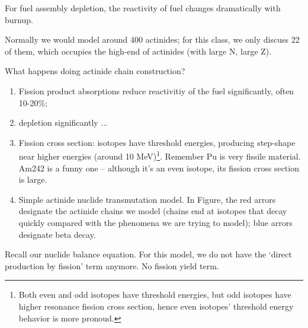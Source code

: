 \documentclass{school-22.211-notes}
\date{April 11, 2012}
\begin{document}
\maketitle

 \label{fuel-depletion}
For fuel assembly depletion, the reactivity of fuel changes dramatically with burnup. 

Normally we would model around 400 actinides; for this class, we only discuss 22 of them, which occupies the high-end of actinides (with large N, large Z). 

What happens doing actinide chain construction? 
\begin{enumerate}
\item Fission product absorptions reduce reactivitiy of the fuel significantly, often 10-20\%;
\item {} depletion significantly ...

\item Fission cross section: isotopes have threshold energies, producing step-shape near higher energies (around 10 MeV)\footnote{Both even and odd isotopes have threshold energies, but odd isotopes have higher resonance fission cross section, hence even isotopes' threshold energy behavior is more pronoud.}. Remember Pu is very fissile material. Am242 is a funny one -- although it's an even isotope, its fission cross section is large. 

\item Simple actinide nuclide transmutation model. In Figure, the red arrors designate the actinide chains we model (chains end at isotopes that decay quickly compared with the phenomena we are trying to model); blue arrors designate beta decay. 
\end{enumerate}



\clearpage
{}
Recall our nuclide balance equation. For this model, we do not have the `direct production by fission' term anymore.  No fission yield term. 
\end{document}

